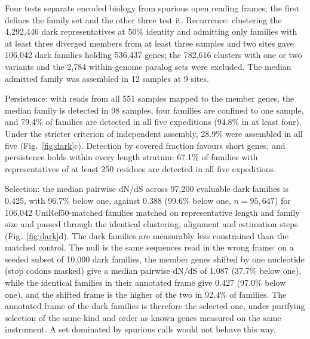 \documentclass[11pt]{article}
\begin{document}
Four tests separate encoded biology from spurious open reading frames; the first defines the family
set and the other three test it. Recurrence: clustering the 4{,}292{,}446 dark representatives at
50\% identity and admitting only families with at least three diverged members from at least three
samples and two sites gave 106{,}042 dark families holding 536{,}437 genes; the 782{,}616 clusters
with one or two variants and the 2{,}784 within-genome paralog sets were excluded. The median
admitted family was assembled in 12 samples at 9 sites.

Persistence: with reads from all 551 samples mapped to the member genes, the median family is
detected in 98 samples, four families are confined to one sample, and 79.4\% of families are detected
in all five expeditions (94.8\% in at least four). Under the stricter criterion of independent
assembly, 28.9\% were assembled in all five (Fig.~\ref{fig:dark}c). Detection by covered fraction
favours short genes, and persistence holds within every length stratum: 67.1\% of families with
representatives of at least 250 residues are detected in all five expeditions.

Selection: the median pairwise dN/dS across 97{,}200 evaluable dark families is 0.425, with 96.7\%
below one, against 0.388 (99.6\% below one, $n = 95{,}647$) for 106{,}042 UniRef50-matched families
matched on representative length and family size and passed through the identical clustering,
alignment and estimation steps (Fig.~\ref{fig:dark}d). The dark families are measurably less
constrained than the matched control. The null is the same sequences read in the wrong frame: on a
seeded subset of 10{,}000 dark families, the member genes shifted by one nucleotide (stop codons
masked) give a median pairwise dN/dS of 1.087 (37.7\% below one), while the identical families in
their annotated frame give 0.427 (97.0\% below one), and the shifted frame is the higher of the two
in 92.4\% of families. The annotated frame of the dark families is therefore the selected one, under
purifying selection of the same kind and order as known genes measured on the same instrument. A set
dominated by spurious calls would not behave this way.
\end{document}
